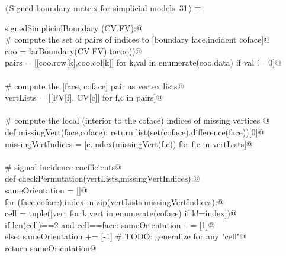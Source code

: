 \documentclass[11pt,oneside]{article}    %
\begin{document}
\begin{flushleft} \small \label{scrap51}
\protect{}$\langle\,$Signed boundary matrix for simplicial models\nobreak\ {\footnotesize 31}$\,\rangle\equiv$
\vspace{-1ex}
\begin{list}{}{} \item
\mbox{}\verb@def signedSimplicialBoundary (CV,FV):@\\
\mbox{}\verb@    # compute the set of pairs of indices to [boundary face,incident coface]@\\
\mbox{}\verb@    coo = larBoundary(CV,FV).tocoo()@\\
\mbox{}\verb@    pairs = [[coo.row[k],coo.col[k]] for k,val in enumerate(coo.data) if val != 0]@\\
\mbox{}\verb@@\\
\mbox{}\verb@    # compute the [face, coface] pair as vertex lists@\\
\mbox{}\verb@    vertLists = [[FV[f], CV[c]] for f,c in pairs]@\\
\mbox{}\verb@@\\
\mbox{}\verb@    # compute the local (interior to the coface) indices of missing vertices @\\
\mbox{}\verb@    def missingVert(face,coface): return list(set(coface).difference(face))[0]@\\
\mbox{}\verb@    missingVertIndices = [c.index(missingVert(f,c)) for f,c in vertLists]@\\
\mbox{}\verb@@\\
\mbox{}\verb@    # signed incidence coefficients@\\
\mbox{}\verb@    def checkPermutation(vertLists,missingVertIndices):@\\
\mbox{}\verb@        sameOrientation = []@\\
\mbox{}\verb@        for (face,coface),index in zip(vertLists,missingVertIndices):@\\
\mbox{}\verb@            cell = tuple([vert for k,vert in enumerate(coface) if k!=index])@\\
\mbox{}\verb@            if len(cell)==2 and cell==face: sameOrientation += [1]@\\
\mbox{}\verb@            else: sameOrientation += [-1]  # TODO: generalize for any "cell"@\\
\mbox{}\verb@        return sameOrientation@\\

\end{list}
\end{flushleft}
\end{document}
